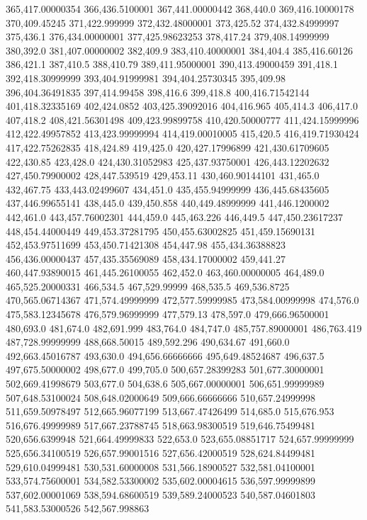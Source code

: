 365,417.00000354
366,436.5100001
367,441.00000442
368,440.0
369,416.10000178
370,409.45245
371,422.999999
372,432.48000001
373,425.52
374,432.84999997
375,436.1
376,434.00000001
377,425.98623253
378,417.24
379,408.14999999
380,392.0
381,407.00000002
382,409.9
383,410.40000001
384,404.4
385,416.60126
386,421.1
387,410.5
388,410.79
389,411.95000001
390,413.49000459
391,418.1
392,418.30999999
393,404.91999981
394,404.25730345
395,409.98
396,404.36491835
397,414.99458
398,416.6
399,418.8
400,416.71542144
401,418.32335169
402,424.0852
403,425.39092016
404,416.965
405,414.3
406,417.0
407,418.2
408,421.56301498
409,423.99899758
410,420.50000777
411,424.15999996
412,422.49957852
413,423.99999994
414,419.00010005
415,420.5
416,419.71930424
417,422.75262835
418,424.89
419,425.0
420,427.17996899
421,430.61709605
422,430.85
423,428.0
424,430.31052983
425,437.93750001
426,443.12202632
427,450.79900002
428,447.539519
429,453.11
430,460.90144101
431,465.0
432,467.75
433,443.02499607
434,451.0
435,455.94999999
436,445.68435605
437,446.99655141
438,445.0
439,450.858
440,449.48999999
441,446.1200002
442,461.0
443,457.76002301
444,459.0
445,463.226
446,449.5
447,450.23617237
448,454.44000449
449,453.37281795
450,455.63002825
451,459.15690131
452,453.97511699
453,450.71421308
454,447.98
455,434.36388823
456,436.00000437
457,435.35569089
458,434.17000002
459,441.27
460,447.93890015
461,445.26100055
462,452.0
463,460.00000005
464,489.0
465,525.20000331
466,534.5
467,529.99999
468,535.5
469,536.8725
470,565.06714367
471,574.49999999
472,577.59999985
473,584.00999998
474,576.0
475,583.12345678
476,579.96999999
477,579.13
478,597.0
479,666.96500001
480,693.0
481,674.0
482,691.999
483,764.0
484,747.0
485,757.89000001
486,763.419
487,728.99999999
488,668.50015
489,592.296
490,634.67
491,660.0
492,663.45016787
493,630.0
494,656.66666666
495,649.48524687
496,637.5
497,675.50000002
498,677.0
499,705.0
500,657.28399283
501,677.30000001
502,669.41998679
503,677.0
504,638.6
505,667.00000001
506,651.99999989
507,648.53100024
508,648.02000649
509,666.66666666
510,657.24999998
511,659.50978497
512,665.96077199
513,667.47426499
514,685.0
515,676.953
516,676.49999989
517,667.23788745
518,663.98300519
519,646.75499481
520,656.6399948
521,664.49999833
522,653.0
523,655.08851717
524,657.99999999
525,656.34100519
526,657.99001516
527,656.42000519
528,624.84499481
529,610.04999481
530,531.60000008
531,566.18900527
532,581.04100001
533,574.75600001
534,582.53300002
535,602.00004615
536,597.99999899
537,602.00001069
538,594.68600519
539,589.24000523
540,587.04601803
541,583.53000526
542,567.998863
